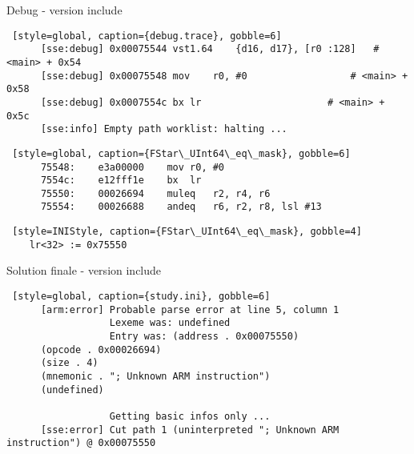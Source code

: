 \documentclass[A4,svgnames,9pt,aspectratio=169]{beamer}
\begin{document}
\begin{frame}[fragile]{Debug - version include}
  \begin{lstlisting} [style=global, caption={debug.trace}, gobble=6]
      [sse:debug] 0x00075544 vst1.64	{d16, d17}, [r0 :128]	# <main> + 0x54
      [sse:debug] 0x00075548 mov	r0, #0               	# <main> + 0x58
      [sse:debug] 0x0007554c bx	lr                    	# <main> + 0x5c
      [sse:info] Empty path worklist: halting ...
  \end{lstlisting}
  \pause
  \begin{lstlisting} [style=global, caption={FStar\_UInt64\_eq\_mask}, gobble=6]
      75548:	e3a00000 	mov	r0, #0
      7554c:	e12fff1e 	bx	lr
      75550:	00026694 	muleq	r2, r4, r6
      75554:	00026688 	andeq	r6, r2, r8, lsl #13
  \end{lstlisting}
  \pause
  \begin{lstlisting} [style=INIStyle, caption={FStar\_UInt64\_eq\_mask}, gobble=4]
    lr<32> := 0x75550
  \end{lstlisting}
\end{frame}


\begin{frame}[fragile]{Solution finale - version include}
  \begin{lstlisting} [style=global, caption={study.ini}, gobble=6]              
      [arm:error] Probable parse error at line 5, column 1
                  Lexeme was: undefined
                  Entry was: (address . 0x00075550)
      (opcode . 0x00026694)
      (size . 4)
      (mnemonic . "; Unknown ARM instruction")
      (undefined)

                  Getting basic infos only ... 
      [sse:error] Cut path 1 (uninterpreted "; Unknown ARM instruction") @ 0x00075550
    \end{lstlisting}
\end{frame}

\end{document}
